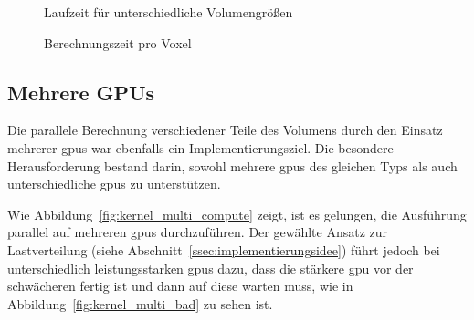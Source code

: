 \begin{figure}
    \centering
    \caption{Laufzeit für unterschiedliche Volumengrößen}\label{fig:laufzeit_gpu} 
\end{figure}

\begin{figure}
    \centering
    \caption{Berechnungszeit pro Voxel}\label{fig:voxelzeit} 
\end{figure}

\subsection{Mehrere GPUs}

Die parallele Berechnung verschiedener Teile des Volumens durch den Einsatz mehrerer \gls{gpu}s war ebenfalls ein
Implementierungsziel. Die besondere Herausforderung bestand darin, sowohl mehrere \gls{gpu}s des gleichen Typs als auch
unterschiedliche \gls{gpu}s zu unterstützen.

Wie Abbildung~\ref{fig:kernel_multi_compute} zeigt, ist es gelungen, die Ausführung parallel auf mehreren \gls{gpu}s
durchzuführen. Der gewählte Ansatz zur Lastverteilung (siehe Abschnitt~\ref{ssec:implementierungsidee}) führt jedoch bei
unterschiedlich leistungsstarken \gls{gpu}s dazu, dass die stärkere \gls{gpu} vor der schwächeren fertig ist und dann
auf diese warten muss, wie in Abbildung~\ref{fig:kernel_multi_bad} zu sehen ist.

